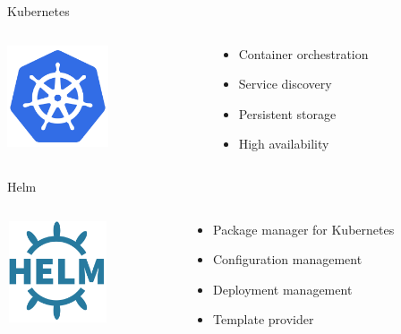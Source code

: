 \documentclass{beamer}
\begin{document}
  \begin{frame}{Kubernetes}
    \begin{columns}[c]
      \begin{column}{.3\textwidth}
          \includegraphics[width=3cm,height=3cm]{images/kubernetes_logo.png}
      \end{column}
      \begin{column}{.7\textwidth}
        \begin{itemize}
          \item Container orchestration
          \item Service discovery
          \item Persistent storage
          \item High availability
        \end{itemize}
      \end{column}
    \end{columns}
  \end{frame}

  \begin{frame}{Helm}
    \begin{columns}[c]
      \begin{column}{.3\textwidth}
          \includegraphics[width=3cm,height=3cm]{images/helm_logo.png}
      \end{column}
      \begin{column}{.7\textwidth}
        \begin{itemize}
          \item Package manager for Kubernetes
          \item Configuration management
          \item Deployment management
          \item Template provider
        \end{itemize}
      \end{column}
    \end{columns}
  \end{frame}
\end{document}
